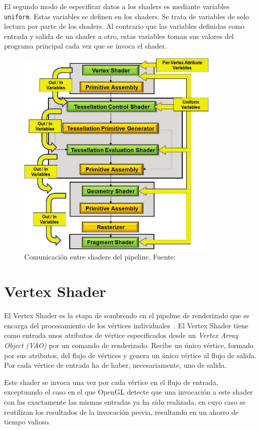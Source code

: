 El segundo modo de especificar datos a los shaders es mediante variables
\verb|uniform|. Estas variables se definen en los shaders. Se trata de variables
de solo lectura por parte de los shaders. Al contrario que las variables
definidas como entrada y salida de un shader a otro, estas variables toman sus
valores del programa principal cada vez que se invoca el shader.  

\begin{figure}
		\centering
		\includegraphics[height=10cm]{figures/variablespipe.png}
		\caption[Comunicación entre shaders del pipeline.]{Comunicación entre
		shaders del pipeline. Fuente:~\cite{Bailey}}
		\label{fig3.1}
\end{figure}

\section{Vertex Shader}
\label{ref:Vertex}

El Vertex Shader es la etapa de sombreado en el pipeline de renderizado que se
encarga del procesamiento de los vértices individuales~\cite{VertexShader}. El
Vertex Shader tiene como entrada unos atributos de vértice especificados desde
un \textit{Vertex Array Object (VAO)} por un comando de renderizado. Recibe un
único vértice, formado por sus atributos, del flujo de vértices y genera un
único vértice al flujo de salida. Por cada vértice de entrada ha de haber,
necesariamente, uno de salida. 

Este shader se invoca una vez por cada vértice en el flujo de entrada,
exceptuando el caso en el que OpenGL detecte que una invocación a este shader
con las exactamente las mismas entradas ya ha sido realizada, en cuyo caso se
reutilizan los resultados de la invocación previa, resultando en un ahorro
de tiempo valioso. 

